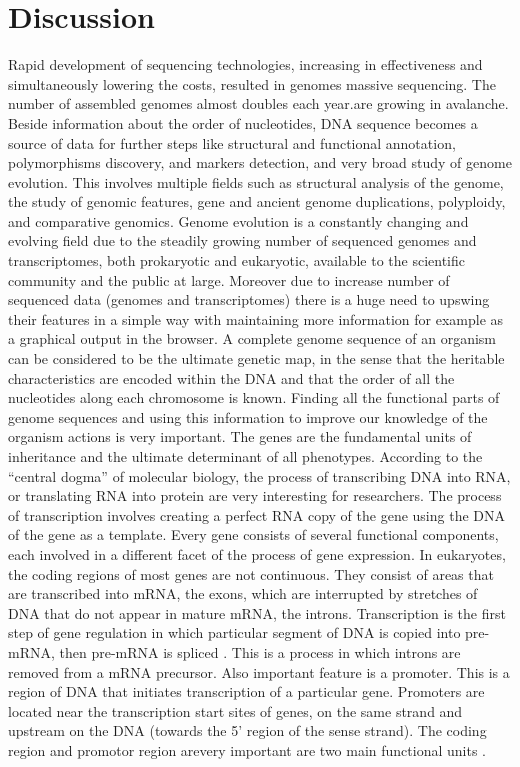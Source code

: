 \documentclass[a4paper]{spie}
\begin{document}
\section{Discussion}

Rapid development of sequencing technologies, increasing in effectiveness and simultaneously lowering the costs, resulted in genomes massive sequencing. The number of assembled genomes almost doubles each year.are growing in avalanche.
Beside information about the order of nucleotides,
DNA sequence becomes a source of data for further steps like structural and functional annotation, polymorphisms discovery, and markers detection, and very broad study of genome evolution. This involves multiple fields such as structural analysis of the genome, the study of genomic features, gene and ancient genome duplications, polyploidy, and comparative genomics. Genome evolution is a constantly changing and evolving field due to the steadily growing number of sequenced genomes and transcriptomes, both prokaryotic and eukaryotic, available to the scientific community and the public at large.
Moreover due to increase  number of sequenced data  (genomes and transcriptomes) there is a huge need to upswing their features in a simple way with maintaining more information for example as a graphical output in the browser. A complete genome sequence of an organism can be considered to be the ultimate genetic map, in the sense that the heritable characteristics are encoded within the DNA and that the order of all the nucleotides along each chromosome is known. Finding all the functional parts of genome sequences and using this information to improve our knowledge of the  organism actions is very important. The genes are the fundamental units of inheritance and the ultimate determinant of all phenotypes. According to the “central dogma” of molecular biology, the process of transcribing DNA into RNA, or translating RNA into protein are very interesting for  researchers. The process of transcription involves creating a perfect RNA copy of the gene using the DNA of the gene as a template. Every gene consists of several functional components, each involved in a different facet of the process of gene expression. In eukaryotes, the coding regions of most genes are not continuous. They consist of areas that are transcribed into mRNA, the exons, which are interrupted by stretches of DNA that do not appear in mature mRNA, the introns. Transcription is the first step of gene regulation in which particular segment of DNA is copied into pre-mRNA, then pre-mRNA is spliced \cite{chen2009mechanisms}. This is a process in which introns are removed from a mRNA precursor. Also important feature is a promoter. This is a region of DNA that initiates transcription of a particular gene. Promoters are located near the transcription start sites of genes, on the same strand and upstream on the DNA (towards the 5' region of the sense strand). The coding region and promotor region arevery important are two main functional units \cite{pawelkowicz2016next}.
\end{document}

